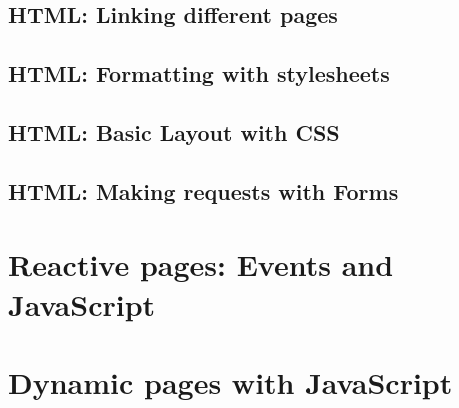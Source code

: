 \documentclass[12pt,a5paper]{book}
\begin{document}
\chapter{HTML: Linking different pages}

\chapter{HTML: Formatting with stylesheets}

\chapter{HTML: Basic Layout with CSS}

\chapter{HTML: Making requests with Forms}

\part{Reactive pages: Events and JavaScript}

\part{Dynamic pages with JavaScript}
\end{document}
